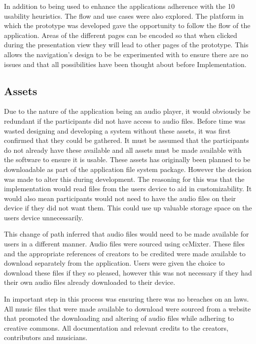 \documentclass{l4proj}
\begin{document}
In addition to being used to enhance the applications adherence with the 10 usability heuristics. The flow and use cases were also explored. The platform in which the prototype was developed gave the opportunity to follow the flow of the application. Areas of the different pages can be encoded so that when clicked during the presentation view they will lead to other pages of the prototype. This allows the navigation's design to be be experimented with to ensure there are no issues and that all possibilities have been thought about before Implementation.

\subsection{Assets}

Due to the nature of the application being an audio player, it would obviously be redundant if the participants did not have access to audio files. Before time was wasted designing and developing a system without these assets, it was first confirmed that they could be gathered. It must be assumed that the participants do not already have these available and all assets must be made available with the software to ensure it is usable. These assets has originally been planned to be downloadable as part of the application file system package. However the decision was made to alter this during development. The reasoning for this was that the implementation would read files from the users device to aid in customizability. It would also mean participants would not need to have the audio files on their device if they did not want them. This could use up valuable storage space on the users device unnecessarily. 

This change of path inferred that audio files would need to be made available for users in a different manner. Audio files were sourced using ccMixter. These files and the appropriate references of creators to be credited were made available to download separately from the application. Users were given the choice to download these files if they so pleased, however this was not necessary if they had their own audio files already downloaded to their device.

In important step in this process was ensuring there was no breaches on an laws. All music files that were made available to download were sourced from a website that promoted the downloading and altering of audio files while adhering to creative commons. All documentation and relevant credits to the creators, contributors and musicians.
\end{document}
